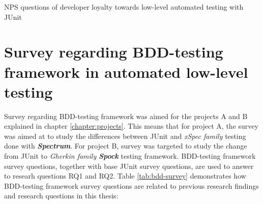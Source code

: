     \vspace{20px}
    \begin{table}[H]
            \caption {NPS questions of developer loyalty towards low-level automated testing with JUnit} \label{tab:junit-pt3}

    \end{table}
    \clearpage
\restoregeometry






\section{Survey regarding BDD-testing framework in automated low-level testing}
\label{section:bdd-survey}
Survey regarding BDD-testing framework was aimed for the projects A and B explained in chapter \ref{chapter:projects}. This means
that for project A, the survey was aimed at to study the differences between JUnit and \textit{xSpec family} testing done with \textbf{\textit{Spectrum}}.
For project B, survey was targeted to study the change from JUnit to \textit{Gherkin family} \textbf{\textit{Spock}} testing framework.
BDD-testing framework survey questions, together with base JUnit survey questions, are used to answer to researh questions
RQ1 and RQ2. Table \ref{tab:bdd-survey} demonstrates how BDD-testing framework survey questions are related to previous research findings
and research questions in this thesis:

